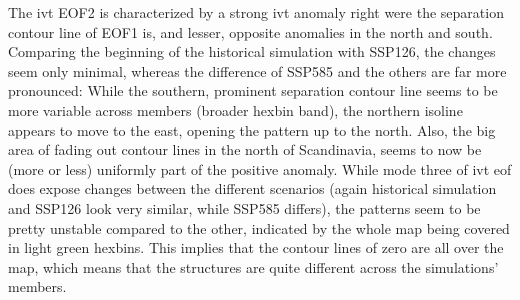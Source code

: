 The \ac{ivt} EOF2 is characterized by a strong \ac{ivt} anomaly right were the separation contour line of EOF1 is, and lesser, opposite anomalies in the north and south. 
Comparing the beginning of the historical simulation with SSP126, the changes seem only minimal, whereas the difference of SSP585 and the others are far more pronounced: 
While the southern, prominent separation contour line seems to be more variable across members (broader hexbin band), the northern isoline appears to move to the east, opening the pattern up to the north. 
Also, the big area of fading out contour lines in the north of Scandinavia, seems to now be (more or less) uniformly part of the positive anomaly.  
While mode three of \ac{ivt} \ac{eof} does expose changes between the different scenarios (again historical simulation and SSP126 look very similar, while SSP585 differs), the patterns seem to be pretty unstable compared to the other, indicated by the whole map being covered in light green hexbins. 
This implies that the contour lines of zero are all over the map, which means that the structures are quite different across the simulations' members. 


